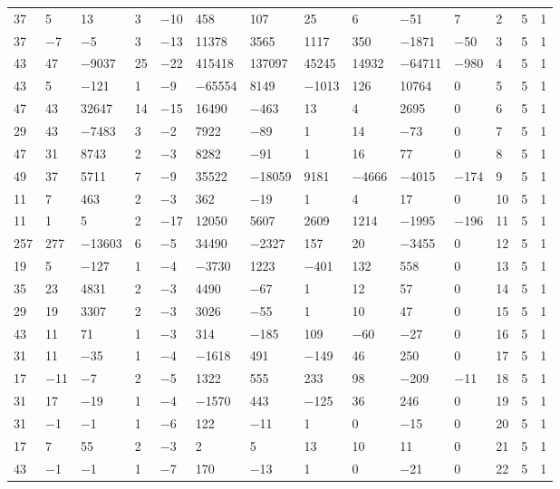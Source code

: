 \documentclass[10pt,a4paper]{amsart}
\numberwithin{equation}{section}
\theoremstyle{definition}
\numberwithin{table}{section}
\begin{document}
{\begin{paracol}{3}
\begin{supertabular}{|w{c}{.32cm}w{c}{.32cm}w{c}{.32cm}@{\hspace{.5cm}}w{c}{.2cm}w{c}{.2cm}|@{\hspace{\tabcolsep}}HHHHHHw{c}{.17cm}w{c}{.17cm}w{c}{.17cm}|}
			37 & 5 & 13 & 3 & $-$10 & 458 & 107 & 25 & 6 & $-$51 & 7 & 2 & 5 & 1 \\
			37 & $-$7 & $-$5 & 3 & $-$13 & 11378 & 3565 & 1117 & 350 & $-$1871 & $-$50 & 3 & 5 & 1 \\
			43 & 47 & $-$9037 & 25 & $-$22 & 415418 & 137097 & 45245 & 14932 & $-$64711 & $-$980 & 4 & 5 & 1 \\
			43 & 5 & $-$121 & 1 & $-$9 & $-$65554 & 8149 & $-$1013 & 126 & 10764 & 0 & 5 & 5 & 1 \\
			47 & 43 & 32647 & 14 & $-$15 & 16490 & $-$463 & 13 & 4 & 2695 & 0 & 6 & 5 & 1 \\
			29 & 43 & $-$7483 & 3 & $-$2 & 7922 & $-$89 & 1 & 14 & $-$73 & 0 & 7 & 5 & 1 \\
			47 & 31 & 8743 & 2 & $-$3 & 8282 & $-$91 & 1 & 16 & 77 & 0 & 8 & 5 & 1 \\
			49 & 37 & 5711 & 7 & $-$9 & 35522 & $-$18059 & 9181 & $-$4666 & $-$4015 & $-$174 & 9 & 5 & 1 \\
			11 & 7 & 463 & 2 & $-$3 & 362 & $-$19 & 1 & 4 & 17 & 0 & 10 & 5 & 1 \\
			11 & 1 & 5 & 2 & $-$17 & 12050 & 5607 & 2609 & 1214 & $-$1995 & $-$196 & 11 & 5 & 1 \\
			257 & 277 & $-$13603 & 6 & $-$5 & 34490 & $-$2327 & 157 & 20 & $-$3455 & 0 & 12 & 5 & 1 \\
			19 & 5 & $-$127 & 1 & $-$4 & $-$3730 & 1223 & $-$401 & 132 & 558 & 0 & 13 & 5 & 1 \\
			35 & 23 & 4831 & 2 & $-$3 & 4490 & $-$67 & 1 & 12 & 57 & 0 & 14 & 5 & 1 \\
			29 & 19 & 3307 & 2 & $-$3 & 3026 & $-$55 & 1 & 10 & 47 & 0 & 15 & 5 & 1 \\
			43 & 11 & 71 & 1 & $-$3 & 314 & $-$185 & 109 & $-$60 & $-$27 & 0 & 16 & 5 & 1 \\
			31 & 11 & $-$35 & 1 & $-$4 & $-$1618 & 491 & $-$149 & 46 & 250 & 0 & 17 & 5 & 1 \\
			17 & $-$11 & $-$7 & 2 & $-$5 & 1322 & 555 & 233 & 98 & $-$209 & $-$11 & 18 & 5 & 1 \\
			31 & 17 & $-$19 & 1 & $-$4 & $-$1570 & 443 & $-$125 & 36 & 246 & 0 & 19 & 5 & 1 \\
			31 & $-$1 & $-$1 & 1 & $-$6 & 122 & $-$11 & 1 & 0 & $-$15 & 0 & 20 & 5 & 1 \\
			17 & 7 & 55 & 2 & $-$3 & 2 & 5 & 13 & 10 & 11 & 0 & 21 & 5 & 1 \\
			43 & $-$1 & $-$1 & 1 & $-$7 & 170 & $-$13 & 1 & 0 & $-$21 & 0 & 22 & 5 & 1 \\

\end{supertabular}
\end{paracol}}
\end{document}
